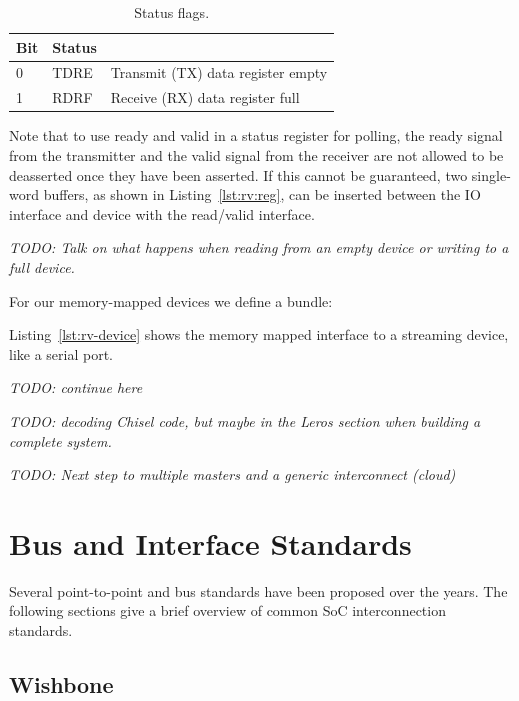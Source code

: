 \documentclass[%
    10pt,
    headinclude, footexclude,
    openright, %
    notitlepage,
    cleardoubleempty,
    headsepline,
    pointlessnumbers,
    bibtotoc, idxtotoc,
    ]{scrbook}
\newcommand{\todo}[1]{{\emph{TODO: #1}}}
\begin{document}
\begin{table}
\centering
\begin{tabular}{lll}
\toprule
Bit & Status & \\
\midrule
0 & TDRE & Transmit (TX) data register empty \\
1 & RDRF & Receive (RX) data register full \\
\bottomrule
\end{tabular}
\caption{Status flags.}
\label{tab:addr:uart:status}
\end{table}

Note that to use ready and valid in a status register for polling, the ready signal from
the transmitter and the valid signal from the receiver are not allowed to be deasserted
once they have been asserted. If this cannot be guaranteed, two single-word buffers,
as shown in Listing~\ref{lst:rv:reg}, can be inserted between the IO interface and
device with the read/valid interface.

\todo{Talk on what happens when reading from an empty device or writing to a full device.}

For our memory-mapped devices we define a bundle:


Listing~\ref{lst:rv-device} shows the memory mapped interface to a streaming
device, like a serial port.

\todo{continue here}









\todo{decoding Chisel code, but maybe in the Leros section when building a complete system.}

\todo{Next step to multiple masters and a generic interconnect (cloud)}

\section{Bus and Interface Standards}

Several point-to-point and bus standards have been proposed over the
years. The following sections give a brief overview of common
SoC interconnection standards.

\subsection{Wishbone}
\end{document}
